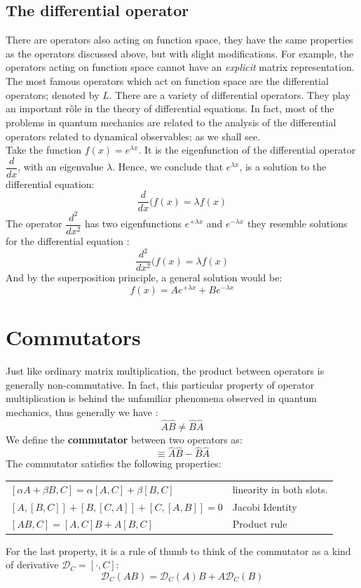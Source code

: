  \subsection{The differential operator}
 There are operators also acting on function space, they have the same properties as the operators discussed above, but with slight modifications. For example, the operators acting on function space cannot have an \textit{explicit} matrix representation. \\
 The most famous operators which act on function space are the differential operators; denoted by $ \hat{L}$. There are a variety of differential operators. They play an important r\^{o}le in the theory of differential equations. In fact, most of the problems in quantum mechanics are related to the analysis of the differential operators related to dynamical observables; as we shall see.\\
 Take the function $ f(x) = e^{ \lambda x}$. It is the eigenfunction of the differential operator $ \dfrac{d}{dx}$, with an eigenvalue $ \lambda$. Hence, we conclude that $e^{ \lambda x}$, is a solution to the differential equation:
 \begin{equation}
 \dfrac{d}{dx} ( f(x) = \lambda f(x)
 \end{equation}
 The operator $\dfrac{d^2}{dx^2}$ has two eigenfunctions $ e^{+ \lambda x}$ and $ e^{-\lambda x}$ they resemble solutions for the differential equation :
 \begin{equation}
 \dfrac{d^2}{dx^2} ( f(x) = \lambda f(x)
 \end{equation}
 And by the superposition principle, a general solution would be:
 \begin{equation}
 f(x) = A e^{+ \lambda x} + B  e^{-\lambda x}
 \end{equation}
 \section{ Commutators}
 Just like ordinary matrix multiplication, the product between operators is generally non-commutative. In fact, this particular property of operator multiplication is behind the unfamiliar phenomena observed in quantum mechanics, thus generally we have :
 \begin{equation}
 \hat{A} \hat{B} \neq \hat{B} \hat{A}
 \end{equation} 
 We define the \textbf{commutator} between two operators as:
 \begin{equation}
 [\hat{A}, \hat{B}] \equiv  \hat{A} \hat{B} - \hat{B} \hat{A}
 \end{equation}
 The commutator satisfies the following properties:\\
 \begin{tabular}{ll}
 	$ [\alpha A+ \beta B, C]= \alpha [ A,C]+\beta[B,C]$& linearity in both slots.\\
 	$[A,[B,C]] + [B,[C,A]] + [C,[A,B]] = 0$ & Jacobi Identity \\
 	$[AB,C] = [A,C]B + A[B,C]$& Product rule 
 \end{tabular}
 For the last property, it is a rule of thumb to think of the commutator as a kind of derivative $\mathcal{D}_C = [\cdot,C]$:
 \[
 \mathcal{D}_C \left( AB\right)  = \mathcal{D}_C (A)B +A \mathcal{D}_C (B)
 \]
